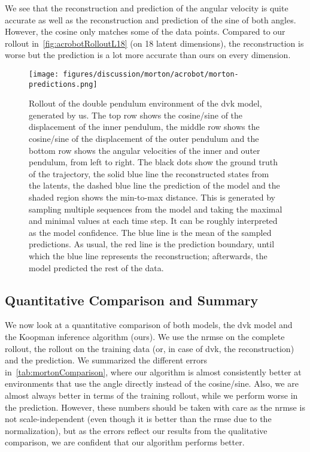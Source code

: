 		We see that the reconstruction and prediction of the angular velocity is quite accurate as well as the reconstruction and prediction of the sine of both angles. However, the cosine only matches some of the data points. Compared to our rollout in~\autoref{fig:acrobotRolloutL18} (on 18 latent dimensions), the reconstruction is worse but the prediction is a lot more accurate than ours on every dimension.

		\begin{figure}
			\centering
			\texttt{[image: figures/discussion/morton/acrobot/morton-predictions.png]}
			\caption[Rollout of the double pendulum environment of the DVK model]{Rollout of the double pendulum environment of the \ac{dvk} model, generated by us. The top row shows the cosine/sine of the displacement of the inner pendulum, the middle row shows the cosine/sine of the displacement of the outer pendulum and the bottom row shows the angular velocities of the inner and outer pendulum, from left to right. The black dots show the ground truth of the trajectory, the solid blue line the reconstructed states from the latents, the dashed blue line the prediction of the model and the shaded region shows the min-to-max distance. This is generated by sampling multiple sequences from the model and taking the maximal and minimal values at each time step. It can be roughly interpreted as the model confidence. The blue line is the mean of the sampled predictions. As usual, the red line is the prediction boundary, until which the blue line represents the reconstruction; afterwards, the model predicted the rest of the data.}
			\label{fig:mortonAcrobot}
		\end{figure}

	\subsection{Quantitative Comparison and Summary}
		We now look at a quantitative comparison of both models, the \ac{dvk} model and the Koopman inference algorithm (ours). We use the \ac{nrmse} on the complete rollout, the rollout on the training data (or, in case of \ac{dvk}, the reconstruction) and the prediction. We summarized the different errors in~\autoref{tab:mortonComparison}, where our algorithm is almost consistently better at environments that use the angle directly instead of the cosine/sine. Also, we are almost always better in terms of the training rollout, while we perform worse in the prediction. However, these numbers should be taken with care as the \ac{nrmse} is not scale-independent (even though it is better than the \ac{rmse} due to the normalization), but as the errors reflect our results from the qualitative comparison, we are confident that our algorithm performs better.

